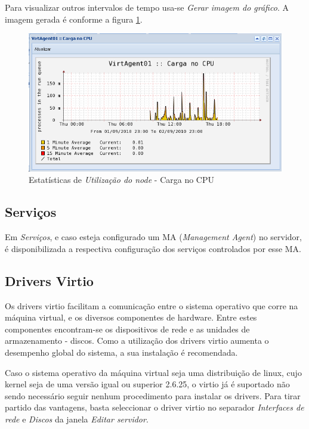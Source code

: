 Para visualizar outros intervalos de tempo usa-se \emph{Gerar imagem do gráfico}. A imagem gerada é conforme a figura \ref{fig:server_stats_nodeLoadRange}.
\begin{figure}[H]
	\begin{center}
	\includegraphics[scale=0.5]{screenshots/server_stats_nodeLoadRange.png}
	\caption{Estatísticas de \emph{Utilização do node} - Carga no CPU}
	\label{fig:server_stats_nodeLoadRange}
	\end{center}
\end{figure}

\subsection{Serviços}
Em \emph{Serviços}, e caso esteja configurado um MA (\emph{Management Agent}) no servidor, é disponibilizada a respectiva configuração dos serviços controlados por esse MA.

\subsection{Drivers Virtio}
Os drivers virtio facilitam a comunicação entre o sistema operativo que corre na máquina virtual, e os diversos componentes de hardware. Entre estes componentes encontram-se os dispositivos de rede e as unidades de armazenamento - discos. Como a utilização dos drivers virtio aumenta o desempenho global do sistema, a sua instalação é recomendada.

Caso o sistema operativo da máquina virtual seja uma distribuição de linux, cujo kernel seja de uma versão igual ou superior 2.6.25, o virtio já é suportado não sendo necessário seguir nenhum procedimento para instalar os drivers. Para tirar partido das vantagens, basta seleccionar o driver virtio no separador \textit{Interfaces de rede} e \textit{Discos} da janela \textit{Editar servidor}.

